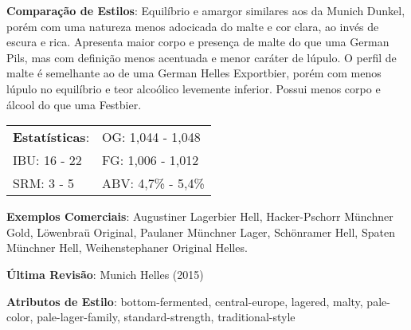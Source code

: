 \textbf{Comparação de Estilos}: Equilíbrio e amargor similares aos da Munich Dunkel, porém com uma natureza menos adocicada do malte e cor clara, ao invés de escura e rica. Apresenta maior corpo e presença de malte do que uma German Pils, mas com definição menos acentuada e menor caráter de lúpulo. O perfil de malte é semelhante ao de uma German Helles Exportbier, porém com menos lúpulo no equilíbrio e teor alcoólico levemente inferior. Possui menos corpo e álcool do que uma Festbier.

\begin{tabular}{@{}p{35mm}p{35mm}@{}}
  \textbf{Estatísticas}: & OG: 1,044 - 1,048 \\
  IBU: 16 - 22  & FG: 1,006 - 1,012  \\
  SRM: 3 - 5   & ABV: 4,7\% - 5,4\%
\end{tabular}

\textbf{Exemplos Comerciais}: Augustiner Lagerbier Hell, Hacker-Pschorr Münchner Gold, Löwenbraü Original, Paulaner Münchner Lager, Schönramer Hell, Spaten Münchner Hell, Weihenstephaner Original Helles.

\textbf{Última Revisão}: Munich Helles (2015)

\textbf{Atributos de Estilo}: bottom-fermented, central-europe, lagered, malty, pale-color, pale-lager-family, standard-strength, traditional-style
